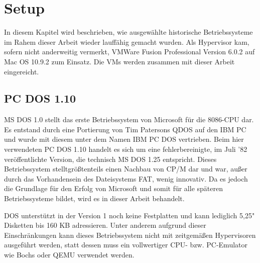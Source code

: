 \chapter{Setup}
\label{chap:setup}

	In diesem Kapitel wird beschrieben, wie ausgewählte historische Betriebssysteme im Rahem dieser Arbeit wieder lauffähig gemacht wurden. Als Hypervisor kam, sofern nicht anderweitig vermerkt, VMWare Fusion Professional Version 6.0.2 auf Mac OS 10.9.2 zum Einsatz. 
	Die VMs werden zusammen mit dieser Arbeit eingereicht.

\section{PC DOS 1.10}

	MS DOS 1.0 stellt das erste Betriebssystem von Microsoft für die 8086-CPU dar. Es entstand durch eine Portierung von Tim Patersons QDOS auf den IBM PC und wurde mit diesem unter dem Namen IBM PC DOS vertrieben. \cite{WinHistory}
	Beim hier verwendeten PC DOS 1.10 handelt es sich um eine fehlerbereinigte, im Juli '82 veröffentlichte Version, die technisch MS DOS 1.25 entspricht. 
	Dieses Betriebssystem stelltgrößtenteils einen Nachbau von CP/M dar und war, außer durch das Vorhandensein des Dateisystems \gls{FAT}, wenig innovativ.
	Da es jedoch die Grundlage für den Erfolg von Microsoft und somit für alle späteren Betriebssysteme bildet, wird es in dieser Arbeit behandelt.

	DOS unterstützt in der Version 1 noch keine Festplatten und kann lediglich 5,25" Disketten bis 160 KB adressieren. \cite{WinHistory}
	Unter anderem aufgrund dieser Einschränkungen kann dieses Betriebssystem nicht mit zeitgemäßen Hypervisoren ausgeführt werden, statt dessen muss ein vollwertiger CPU- bzw. PC-Emulator wie Bochs oder QEMU verwendet werden. 

